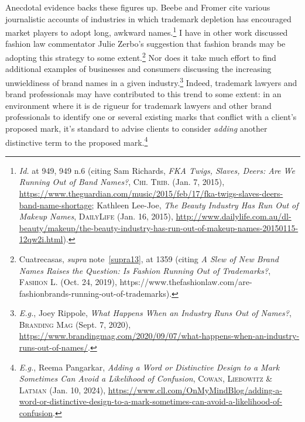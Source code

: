 \documentclass[letterpaper, 11pt, oneside]{article}
\begin{document}
Anecdotal evidence backs these figures up. Beebe and Fromer cite various journalistic accounts of industries in which trademark depletion has encouraged market players to adopt long, awkward names.\footnote{\textit{Id.} at 949, 949 n.6 (citing Sam Richards, \textit{FKA Twigs, Slaves, Deers: Are We Running Out of Band Names?}, \textsc{Chi. Trib.} (Jan. 7, 2015), \url{https://www.theguardian.com/music/2015/feb/17/fka-twigs-slaves-deers-band-name-shortage}; Kathleen Lee-Joe, \textit{The Beauty Industry Has Run Out of Makeup Names}, \textsc{DailyLife} (Jan. 16, 2015), \url{http://www.dailylife.com.au/dl-beauty/makeup/the-beauty-industry-has-run-out-of-makeup-names-20150115-12qw2i.html}).} I have in other work discussed fashion law commentator Julie Zerbo's suggestion that fashion brands may be adopting this strategy to some extent.\footnote{Cuatrecasas, \textit{supra} note~\ref{supra13}, at 1359 (citing \textit{A Slew of New Brand Names Raises the Question: Is Fashion Running Out of Trademarks?}, \textsc{Fashion L.} (Oct. 24, 2019), https://www.thefashionlaw.com/are-fashionbrands-running-out-of-trademarks).} Nor does it take much effort to find additional examples of businesses and consumers discussing the increasing unwieldiness of brand names in a given industry.\footnote{\textit{E.g.}, Joey Rippole, \textit{What Happens When an Industry Runs Out of Names?}, \textsc{Branding Mag} (Sept. 7, 2020), \url{https://www.brandingmag.com/2020/09/07/what-happens-when-an-industry-runs-out-of-names/}.} Indeed, trademark lawyers and brand professionals may have contributed to this trend to some extent: in an environment where it is de rigueur for trademark lawyers and other brand professionals to identify one or several existing marks that conflict with a client's proposed mark, it's standard to advise clients to consider \textit{adding} another distinctive term to the proposed mark.\footnote{\textit{E.g.}, Reema Pangarkar, \textit{Adding a Word or Distinctive Design to a Mark Sometimes Can Avoid a Likelihood of Confusion}, \textsc{Cowan, Liebowitz \& Latman} (Jan. 10, 2024), \url{https://www.cll.com/OnMyMindBlog/adding-a-word-or-distinctive-design-to-a-mark-sometimes-can-avoid-a-likelihood-of-confusion}.}
\end{document}
